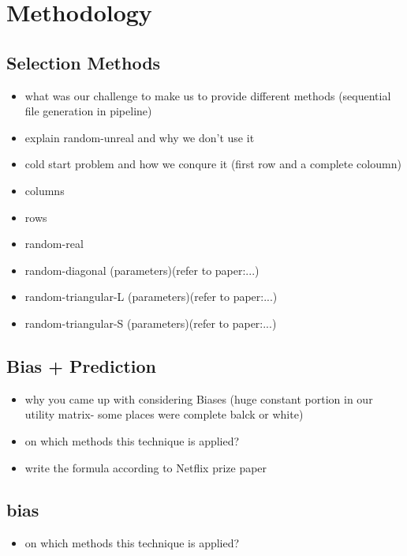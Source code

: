 \chapter{Methodology}
\section{Selection Methods}
\begin{tcolorbox}
\begin{itemize}
\item what was our challenge to make us to provide different methods (sequential file generation in pipeline)
\item explain random-unreal and why we don't use it
\item cold start problem and how we conqure it (first row and a complete coloumn)
\item columns 
\item rows
\item random-real
\item random-diagonal (parameters)(refer to paper:...)
\item random-triangular-L (parameters)(refer to paper:...)
\item random-triangular-S (parameters)(refer to paper:...)
\end{itemize}
\end{tcolorbox}

\section{Bias + Prediction}
\begin{tcolorbox}
\begin{itemize}
\item why you came up with considering Biases (huge constant portion in our utility matrix- some places were complete balck or white)
\item on which methods this technique is applied?
\item write the formula according to Netflix prize paper
\end{itemize}
\end{tcolorbox}

\section{bias}
\begin{tcolorbox}
\begin{itemize}
\item on which methods this technique is applied?

\end{itemize}
\end{tcolorbox}
